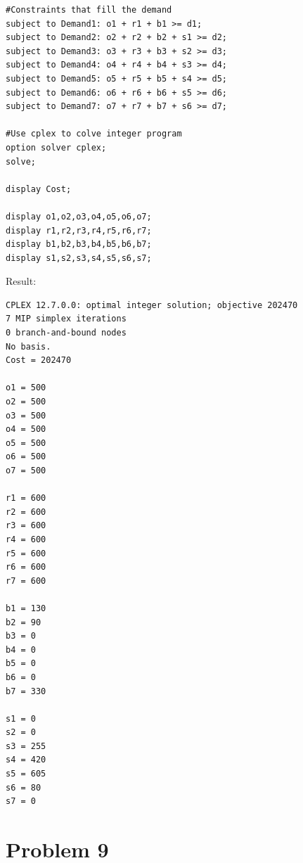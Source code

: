 \documentclass{article}
\begin{document}
{\begin{lstlisting}[language=AMPL]
#Constraints that fill the demand
subject to Demand1: o1 + r1 + b1 >= d1;
subject to Demand2: o2 + r2 + b2 + s1 >= d2;
subject to Demand3: o3 + r3 + b3 + s2 >= d3;
subject to Demand4: o4 + r4 + b4 + s3 >= d4;
subject to Demand5: o5 + r5 + b5 + s4 >= d5;
subject to Demand6: o6 + r6 + b6 + s5 >= d6;
subject to Demand7: o7 + r7 + b7 + s6 >= d7;

#Use cplex to colve integer program
option solver cplex;
solve;

display Cost;

display o1,o2,o3,o4,o5,o6,o7;
display r1,r2,r3,r4,r5,r6,r7;
display b1,b2,b3,b4,b5,b6,b7;
display s1,s2,s3,s4,s5,s6,s7;
    \end{lstlisting}

    Result:
    \begin{lstlisting}[language=AMPL]
CPLEX 12.7.0.0: optimal integer solution; objective 202470
7 MIP simplex iterations
0 branch-and-bound nodes
No basis.
Cost = 202470

o1 = 500
o2 = 500
o3 = 500
o4 = 500
o5 = 500
o6 = 500
o7 = 500

r1 = 600
r2 = 600
r3 = 600
r4 = 600
r5 = 600
r6 = 600
r7 = 600

b1 = 130
b2 = 90
b3 = 0
b4 = 0
b5 = 0
b6 = 0
b7 = 330

s1 = 0
s2 = 0
s3 = 255
s4 = 420
s5 = 605
s6 = 80
s7 = 0
    \end{lstlisting}
}

\section*{Problem 9}{

}
\end{document}
